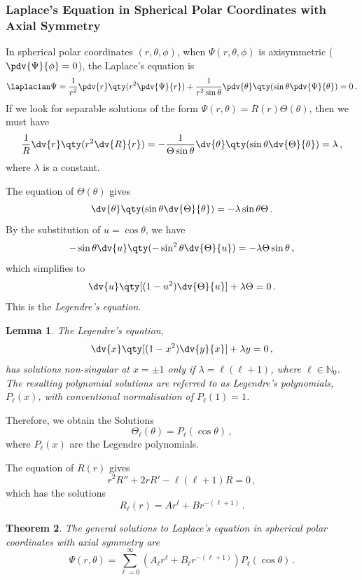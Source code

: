\documentclass{article}
\theoremstyle{plain}\theoremheaderfont{\normalfont\itshape}\theorembodyfont{\rmfamily}\theoremseparator{.}\newtheorem*{rem}{Remark}\newtheorem*{ex}{Example}\newtheorem*{proof}{Proof}\newtheorem*{altp}{Alternative proof}
\theoremstyle{plain}\theoremheaderfont{\normalfont\bfseries}\theorembodyfont{\rmfamily}\theoremseparator{.}\newtheorem{thm}{Theorem}[section]\newtheorem{lem}[thm]{Lemma}\newtheorem{prop}[thm]{Proposition}\newtheorem*{cor}{Corollary}\newtheorem{defn}[thm]{Definition}\newtheorem{clm}[thm]{Claim}\newtheorem{clminproof}{Claim}
\theoremstyle{break}\theoremheaderfont{\normalfont\itshape}\theorembodyfont{\rmfamily}\theoremseparator{.\medskip}\newtheorem*{proofskip}{Proof}\newtheorem*{exs}{Examples}\newtheorem*{rems}{Remarks}
\theoremstyle{break}\theoremheaderfont{\normalfont\bfseries}\theorembodyfont{\rmfamily}\theoremseparator{.\medskip}\newtheorem{lemskip}[thm]{Lemma}\newtheorem{defnskip}[thm]{Definition}\newtheorem{propskip}[thm]{Proposition}\newtheorem{thmskip}[thm]{Theorem}
\numberwithin{equation}{section}
\begin{document}
	\subsubsection{Laplace's Equation in Spherical Polar Coordinates with Axial Symmetry}
	In spherical polar coordinates \((r,\theta,\phi)\), when \(\Psi(r,\theta,\phi)\) is axisymmetric (\(\pdv{\Psi}{\phi}=0\)), the Laplace's equation is
	\[\laplacian\Psi=\frac{1}{r^2}\pdv{r}\qty(r^2\pdv{\Psi}{r})+\frac{1}{r^2\sin\theta}\pdv{\theta}\qty(\sin\theta\pdv{\Psi}{\theta})=0\,.\]
	If we look for separable solutions of the form \(\Psi(r,\theta)=R(r)\Theta(\theta)\), then we must have
	\[\frac{1}{R}\dv{r}\qty(r^2\dv{R}{r})=-\frac{1}{\Theta\sin\theta}\dv{\theta}\qty(\sin\theta\dv{\Theta}{\theta})=\lambda\,,\]
	where \(\lambda\) is a constant.

	The equation of \(\Theta(\theta)\) gives
	\[\dv{\theta}\qty(\sin\theta\dv{\Theta}{\theta})=-\lambda\sin\theta\Theta\,.\]
	By the substitution of \(u=\cos\theta\), we have
	\[-\sin\theta\dv{u}\qty(-\sin^2\theta\dv{\Theta}{u})=-\lambda\Theta\sin\theta\,,\]
	which simplifies to
	\[\dv{u}\qty[(1-u^2)\dv{\Theta}{u}]+\lambda\Theta=0\,.\]
	This is the \textit{Legendre's equation}.

	\begin{lem}
		The Legendre's equation,
		\[\dv{x}\qty[(1-x^2)\dv{y}{x}]+\lambda y=0\,,\]
		has solutions non-singular at \(x=\pm 1\) only if \(\lambda=\ell(\ell+1)\), where \(\ell\in\mathbb{N}_0\). The resulting polynomial solutions are referred to as Legendre's polynomials, \(P_\ell(x)\), with conventional normalisation of \(P_\ell(1)=1\).
	\end{lem}

	Therefore, we obtain the Solutions
	\[\Theta_\ell(\theta)=P_\ell(\cos\theta)\,,\]
	where \(P_\ell(x)\) are the Legendre polynomials.

	The equation of \(R(r)\) gives
	\[r^2R''+2rR'-\ell(\ell+1)R=0\,,\]
	which has the solutions
	\[R_\ell(r)=Ar^\ell+Br^{-(\ell+1)}\,.\]
	\begin{thm}
		The general solutions to Laplace's equation in spherical polar coordinates with axial symmetry are
		\[\Psi(r,\theta)=\sum_{\ell=0}^{\infty}(A_\ell r^\ell+B_\ell r^{-(\ell+1)}) P_\ell(\cos\theta)\,.\]
	\end{thm}
\end{document}
